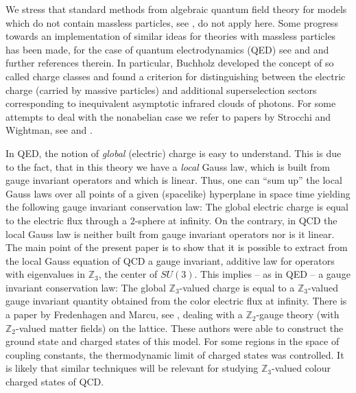 \documentclass[a4paper,12pt]{article}
\begin{document}
We stress that standard methods from algebraic quantum field
theory for models which do not contain massless particles, see
\cite{DHR}, do not apply here. Some progress towards an
implementation of similar ideas for theories with massless
particles has been made, for the case of quantum electrodynamics
(QED) see \cite{JF} and \cite{Bu} and further references therein.
In particular, Buchholz developed the concept of so called charge
classes and found a criterion for distinguishing between the
electric charge (carried by massive particles) and additional
superselection sectors corresponding to inequivalent asymptotic
infrared clouds of photons. For some attempts to deal with the
nonabelian case we refer to papers by Strocchi and Wightman, see
\cite{SW1} and \cite{S}.


In QED, the notion of {\em global} (electric) charge is easy to
understand. This is due to the fact, that in this theory we have a
{\em local} Gauss law, which is built from gauge invariant
operators and which is linear. Thus, one can ``sum up'' the local
Gauss laws over all points of a given (spacelike) hyperplane in
space time yielding the following gauge invariant conservation
law: The global electric charge is equal to the electric flux
through a $2$-sphere at infinity. On the contrary, in QCD the
local Gauss law is neither built from gauge invariant operators
nor is it linear. The main point of the present paper is to show
that it is possible to extract from the local Gauss equation of
QCD a gauge invariant, additive law for operators with eigenvalues
in ${\mathbb Z}_3$, the center of $SU(3)$. This implies -- as in
QED -- a gauge invariant conservation law: The global ${\mathbb
Z}_3$-valued charge is equal to a ${\mathbb Z}_3$-valued gauge
invariant quantity obtained from the color electric flux at
infinity. There is a paper by Fredenhagen and Marcu, see
\cite{FM}, dealing with a ${\mathbb Z}_2$-gauge theory (with
${\mathbb Z}_2$-valued matter fields) on the lattice. These
authors were able to construct the ground state and charged states
of this model. For some regions in the space of coupling
constants, the thermodynamic limit of charged states was
controlled. It is likely that similar techniques will be relevant
for studying ${\mathbb Z}_3$-valued colour charged states of QCD.
\end{document}
